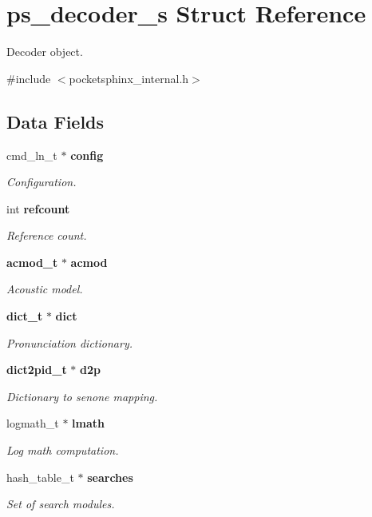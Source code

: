 \section{ps\+\_\+decoder\+\_\+s Struct Reference}
\label{structps__decoder__s}


Decoder object.  




{\ttfamily \#include $<$pocketsphinx\+\_\+internal.\+h$>$}

\subsection*{Data Fields}
\begin{DoxyCompactItemize}
\item 
cmd\+\_\+ln\+\_\+t $\ast$ {\bf config}
\begin{DoxyCompactList}\small\item\em Configuration. \end{DoxyCompactList}\item 
int {\bf refcount}
\begin{DoxyCompactList}\small\item\em Reference count. \end{DoxyCompactList}\item 
{\bf acmod\+\_\+t} $\ast$ {\bf acmod}
\begin{DoxyCompactList}\small\item\em Acoustic model. \end{DoxyCompactList}\item 
{\bf dict\+\_\+t} $\ast$ {\bf dict}
\begin{DoxyCompactList}\small\item\em Pronunciation dictionary. \end{DoxyCompactList}\item 
{\bf dict2pid\+\_\+t} $\ast$ {\bf d2p}
\begin{DoxyCompactList}\small\item\em Dictionary to senone mapping. \end{DoxyCompactList}\item 
logmath\+\_\+t $\ast$ {\bf lmath}
\begin{DoxyCompactList}\small\item\em Log math computation. \end{DoxyCompactList}\item 
hash\+\_\+table\+\_\+t $\ast$ {\bf searches}
\begin{DoxyCompactList}\small\item\em Set of search modules. \end{DoxyCompactList}\item 

\end{DoxyCompactItemize}
